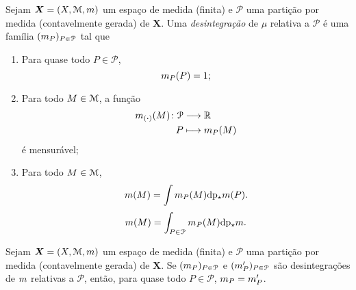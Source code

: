\begin{definition}
Sejam $\bm X=(X,\mathcal{M},m)$ um espaço de medida (finita) e $\mathcal P$ uma partição por medida (contavelmente gerada) de $\bm X$. Uma \emph{desintegração} de $\mu$ relativa a $\mathcal P$ é uma família $(m_P)_{P \in \mathcal P}$ tal que
	\begin{enumerate}
	\item Para quase todo $P \in \mathcal P$,
		\begin{equation*}
		m_P(P)=1;
		\end{equation*}
	
	\item Para todo $M \in \mathcal{M}$, a função
		\begin{align*}
		{m_{(\bm{\cdot})}(M)}\colon {\mathcal P} &\longrightarrow {\mathbb{R}} \\{P} &\longmapsto m_P(M)
		\end{align*}
é mensurável;
	
	\item Para todo $M \in \mathcal{M}$,
		\begin{equation*}
		m(M) = \int m_P(M) \mathrm{d}\mathrm{p}_\star m(P).
		\end{equation*}
		\begin{equation*}
		m(M) = \int_{P \in \mathcal P} m_P(M) \mathrm{d}\mathrm{p}_\star m.
		\end{equation*}
	\end{enumerate}
\end{definition}

\begin{proposition}
Sejam $\bm X=(X,\mathcal{M},m)$ um espaço de medida (finita) e $\mathcal P$ uma partição por medida (contavelmente gerada) de $\bm X$. Se $(m_P)_{P \in \mathcal P}$ e $(m'_P)_{P \in \mathcal P}$ são desintegrações de $m$ relativas a $\mathcal P$, então, para quase todo $P \in \mathcal P$, $m_P=m'_P$.
\end{proposition}